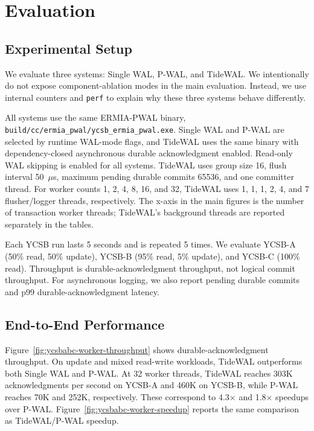 \section{Evaluation}
\label{sec:evaluation}

\subsection{Experimental Setup}
\label{sec:evaluation-setup}

We evaluate three systems: Single WAL, P-WAL, and TideWAL.  We intentionally do
not expose component-ablation modes in the main evaluation.  Instead, we use
internal counters and \texttt{perf} to explain why these three systems behave
differently.

All systems use the same ERMIA-PWAL binary,
\texttt{build/cc/ermia\_pwal/ycsb\_ermia\_pwal.exe}.  Single WAL and P-WAL are
selected by runtime WAL-mode flags, and TideWAL uses the same binary with
dependency-closed asynchronous durable acknowledgment enabled.  Read-only WAL
skipping is enabled for all systems.  TideWAL uses group size 16, flush interval
50~$\mu$s, maximum pending durable commits 65536, and one committer thread.
For worker counts 1, 2, 4, 8, 16, and 32, TideWAL uses 1, 1, 1, 2, 4, and 7
flusher/logger threads, respectively.  The x-axis in the main figures is the
number of transaction worker threads; TideWAL's background threads are reported
separately in the tables.

Each YCSB run lasts 5 seconds and is repeated 5 times.  We evaluate YCSB-A
(50\% read, 50\% update), YCSB-B (95\% read, 5\% update), and YCSB-C (100\%
read).  Throughput is durable-acknowledgment throughput, not logical commit
throughput.  For asynchronous logging, we also report pending durable commits
and p99 durable-acknowledgment latency.

\subsection{End-to-End Performance}
\label{sec:evaluation-e2e}

Figure~\ref{fig:ycsbabc-worker-throughput} shows durable-acknowledgment
throughput.  On update and mixed read-write workloads, TideWAL outperforms both
Single WAL and P-WAL.  At 32 worker threads, TideWAL reaches 303K acknowledgments
per second on YCSB-A and 460K on YCSB-B, while P-WAL reaches 70K and 252K,
respectively.  These correspond to 4.3$\times$ and 1.8$\times$ speedups over
P-WAL.  Figure~\ref{fig:ycsbabc-worker-speedup} reports the same comparison as
TideWAL/P-WAL speedup.

